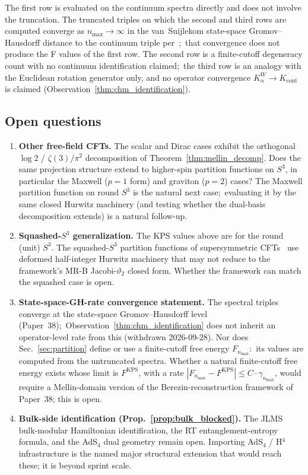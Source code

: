 \documentclass[11pt,a4paper]{article}
\theoremstyle{plain}
\theoremstyle{definition}
\newcommand{\nmax}{n_{\max}}
\newcommand{\sthree}{S^{3}}
\newcommand{\Kalpha}{K_{\alpha}^{W}}
\newcommand{\KPS}{\text{KPS}}
\begin{document}
The first row is evaluated on the continuum spectra directly and does
not involve the truncation. The truncated triples on which the second
and third rows are computed converge as
$\nmax \to \infty$ in the van~Suijlekom state-space Gromov--Hausdorff
distance to the continuum triple per~\cite{paper38};\ that convergence does not produce the F values of the
first row. The second row is a finite-cutoff
degeneracy count with no continuum identification claimed;\ the third row is an analogy with the
Euclidean rotation generator only, and no operator convergence
$\Kalpha \to K_{\mathrm{cont}}$ is claimed (Observation~\ref{thm:chm_identification}).

\subsection{Open questions}

\begin{enumerate}
\item \textbf{Other free-field CFTs.} The scalar and Dirac cases
exhibit the orthogonal $\log 2$ / $\zeta(3)/\pi^{2}$ decomposition of
Theorem~\ref{thm:mellin_decomp}. Does the same projection structure
extend to higher-spin partition functions on $\sthree$, in
particular the Maxwell ($p = 1$ form) and graviton ($p = 2$) cases?
The Maxwell partition function on round $\sthree$ is the natural
next case;\ evaluating it by the same closed
Hurwitz machinery (and testing whether the dual-basis decomposition extends)
is a natural follow-up.

\item \textbf{Squashed-$\sthree$ generalization.} The KPS values
above are for the round (unit) $\sthree$. The squashed-$\sthree$
partition functions of supersymmetric
CFTs~\cite{hama_hosomichi_lee2011} use deformed half-integer
Hurwitz machinery that may not reduce to the framework's MR-B
Jacobi-$\vartheta_{2}$ closed form. Whether the framework can match
the squashed case is open.

\item \textbf{State-space-GH-rate convergence statement.} The
spectral triples converge at the state-space Gromov--Hausdorff level
(Paper~38);\ Observation~\ref{thm:chm_identification} does not inherit
an operator-level rate from this (withdrawn 2026-09-28). Nor does
Sec.~\ref{sec:partition} define or use a finite-cutoff free energy
$F_{\nmax}$:\ its values are computed from the untruncated spectra.
Whether a natural finite-cutoff free energy exists whose limit is
$F^{\KPS}$, with a rate $|F_{\nmax} - F^{\KPS}| \le C \cdot
\gamma_{\nmax}$, would require a Mellin-domain version of the
Berezin-reconstruction framework of Paper~38; this is open.

\item \textbf{Bulk-side identification (Prop.~\ref{prop:bulk_blocked}).}
The JLMS bulk-modular Hamiltonian identification, the RT
entanglement-entropy formula, and the AdS$_{4}$ dual geometry
remain open. Importing AdS$_{4}$ / H$^{4}$ infrastructure is the
named major structural extension that would reach these; it is
beyond sprint scale.
\end{enumerate}
\end{document}
